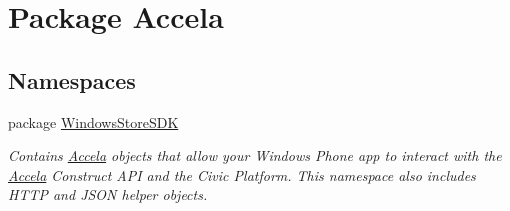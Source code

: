 \hypertarget{namespace_accela}{\section{Package Accela}
\label{namespace_accela}
}
\subsection*{Namespaces}
\begin{DoxyCompactItemize}
\item 
package \hyperlink{namespace_accela_1_1_windows_store_s_d_k}{Windows\+Store\+S\+D\+K}
\begin{DoxyCompactList}\small\item\em Contains \hyperlink{namespace_accela}{Accela} objects that allow your Windows Phone app to interact with the \hyperlink{namespace_accela}{Accela} Construct A\+P\+I and the Civic Platform. This namespace also includes H\+T\+T\+P and J\+S\+O\+N helper objects. \end{DoxyCompactList}\end{DoxyCompactItemize}
